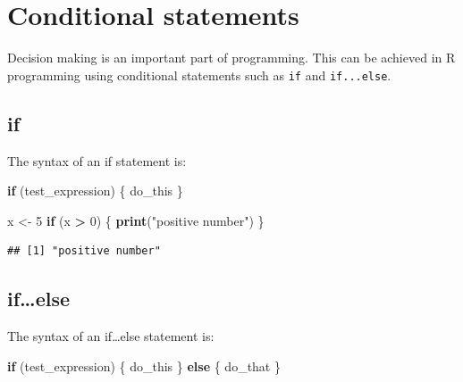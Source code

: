 \documentclass[
]{book}
\newenvironment{Shaded}{\begin{snugshade}}{\end{snugshade}}
\newcommand{\ControlFlowTok}[1]{\textcolor[rgb]{0.13,0.29,0.53}{\textbf{#1}}}
\newcommand{\DecValTok}[1]{\textcolor[rgb]{0.00,0.00,0.81}{#1}}
\newcommand{\KeywordTok}[1]{\textcolor[rgb]{0.13,0.29,0.53}{\textbf{#1}}}
\newcommand{\NormalTok}[1]{#1}
\newcommand{\OperatorTok}[1]{\textcolor[rgb]{0.81,0.36,0.00}{\textbf{#1}}}
\newcommand{\StringTok}[1]{\textcolor[rgb]{0.31,0.60,0.02}{#1}}
\begin{document}
\hypertarget{conditional-statements}{%
\section{Conditional statements}\label{conditional-statements}}

Decision making is an important part of programming. This can be achieved in R programming using conditional statements such as \texttt{if} and \texttt{if...else}.

\hypertarget{if}{%
\subsection*{if}\label{if}}

The syntax of an if statement is:

\begin{Shaded}
\begin{Highlighting}[]
\ControlFlowTok{if}\NormalTok{ (test_expression) \{}
\NormalTok{  do_this}
\NormalTok{\}}
\end{Highlighting}
\end{Shaded}

\begin{Shaded}
\begin{Highlighting}[]
\NormalTok{x <-}\StringTok{ }\DecValTok{5}
\ControlFlowTok{if}\NormalTok{ (x }\OperatorTok{>}\StringTok{ }\DecValTok{0}\NormalTok{) \{}
  \KeywordTok{print}\NormalTok{(}\StringTok{"positive number"}\NormalTok{)}
\NormalTok{\}}
\end{Highlighting}
\end{Shaded}

\begin{verbatim}
## [1] "positive number"
\end{verbatim}

\hypertarget{ifelse}{%
\subsection*{if\ldots else}\label{ifelse}}

The syntax of an if\ldots else statement is:

\begin{Shaded}
\begin{Highlighting}[]
\ControlFlowTok{if}\NormalTok{ (test_expression) \{}
\NormalTok{  do_this}
\NormalTok{\} }\ControlFlowTok{else}\NormalTok{ \{}
\NormalTok{    do_that}
\NormalTok{\}}
\end{Highlighting}
\end{Shaded}
\end{document}
